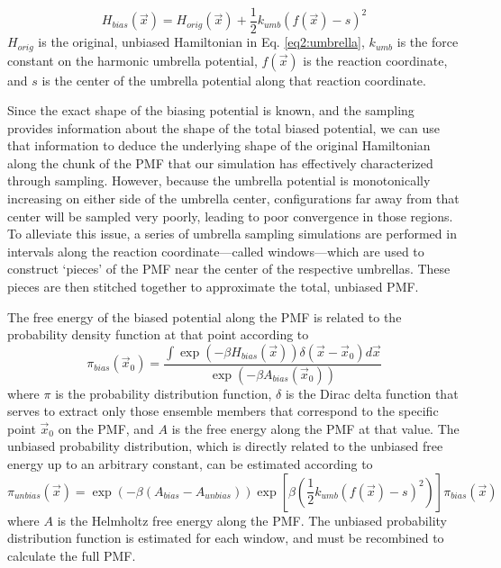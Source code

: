 \begin{equation}
   H_{bias}(\vec{x}) = H_{orig}(\vec{x}) + \frac 1 2 k_{umb}(f(\vec{x}) - s)^2
   \label{eq2:umbrella}
\end{equation}
$H_{orig}$ is the original, unbiased Hamiltonian in Eq. \ref{eq2:umbrella},
$k_{umb}$ is the force constant on the harmonic umbrella potential, $f(\vec{x})$
is the reaction coordinate, and $s$ is the center of the umbrella potential
along that reaction coordinate.

Since the exact shape of the biasing potential is known, and the sampling
provides information about the shape of the total biased potential, we can use
that information to deduce the underlying shape of the original Hamiltonian
along the chunk of the PMF that our simulation has effectively characterized
through sampling. However, because the umbrella potential is monotonically
increasing on either side of the umbrella center, configurations far away from
that center will be sampled very poorly, leading to poor convergence in those
regions. To alleviate this issue, a series of umbrella sampling simulations are
performed in intervals along the reaction coordinate---called windows---which
are used to construct `pieces' of the PMF near the center of the respective
umbrellas. These pieces are then stitched together to approximate the total,
unbiased PMF.

The free energy of the biased potential along the PMF is related to the
probability density function at that point according to
\begin{equation*}
   \pi_{bias}(\vec{x}_0) = \frac {\int \exp \left( -\beta H_{bias} (\vec{x})
         \right) \delta (\vec{x} - \vec{x}_0) d\vec{x}}
         {\exp\left(-\beta A_{bias}(\vec{x}_0)\right)}
\end{equation*}
where $\pi$ is the probability distribution function, $\delta$ is the Dirac
delta function that serves to extract only those ensemble members that
correspond to the specific point $\vec{x}_0$ on the PMF, and $A$ is the free
energy along the PMF at that value. The unbiased probability distribution, which
is directly related to the unbiased free energy up to an arbitrary constant, can
be estimated according to
\begin{equation*}
   \pi_{unbias}(\vec{x}) = \exp\left(-\beta(A_{bias}-A_{unbias}) \right)
                  \exp\left[\beta\left(\frac 1 2 k_{umb}(f(\vec{x})-s)^2 \right)
                  \right] \pi_{bias}(\vec{x})
\end{equation*}
where $A$ is the Helmholtz free energy along the PMF. The unbiased probability
distribution function is estimated for each window, and must be recombined to
calculate the full PMF. \cite{Tuckerman_Book_StatMech_TheoryAndSim}

